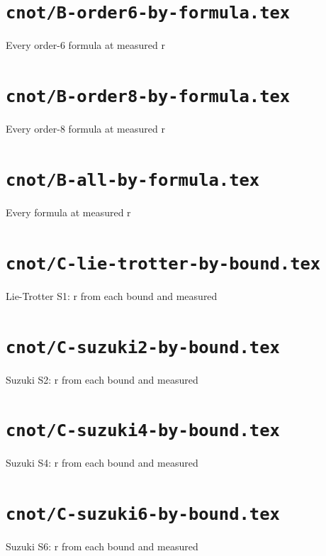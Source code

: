 \documentclass{article}
\begin{document}
\section*{\texttt{cnot/B-order6-by-formula.tex}}
Every order-6 formula at measured r\par\medskip

\clearpage

\section*{\texttt{cnot/B-order8-by-formula.tex}}
Every order-8 formula at measured r\par\medskip

\clearpage

\section*{\texttt{cnot/B-all-by-formula.tex}}
Every formula at measured r\par\medskip

\clearpage

\section*{\texttt{cnot/C-lie-trotter-by-bound.tex}}
Lie-Trotter S1: r from each bound and measured\par\medskip

\clearpage

\section*{\texttt{cnot/C-suzuki2-by-bound.tex}}
Suzuki S2: r from each bound and measured\par\medskip

\clearpage

\section*{\texttt{cnot/C-suzuki4-by-bound.tex}}
Suzuki S4: r from each bound and measured\par\medskip

\clearpage

\section*{\texttt{cnot/C-suzuki6-by-bound.tex}}
Suzuki S6: r from each bound and measured\par\medskip

\clearpage
\end{document}
